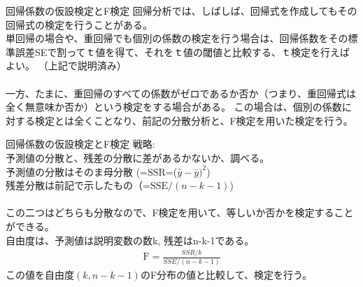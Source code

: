 \documentclass[dvipdfmx,autodetect-engine, unicode, 10pt, aspectratio=169]{beamer}
\begin{document}
\begin{frame}{回帰係数の仮設検定とF検定}
    回帰分析では、しばしば、回帰式を作成してもその回帰式の検定を行うことがある。\\
    単回帰の場合や、重回帰でも個別の係数の検定を行う場合は、回帰係数をその標準誤差SEで割ってｔ値を得て、それをｔ値の閾値と比較する、ｔ検定を行えばよい。 （上記で説明済み）\\　\\
    一方、たまに、重回帰のすべての係数がゼロであるか否か（つまり、重回帰式は全く無意味か否か）という検定をする場合がある。
    この場合は、個別の係数に対する検定とは全くことなり、前記の分散分析と、F検定を用いた検定を行う。
\end{frame}

\begin{frame}{回帰係数の仮設検定とF検定}
    戦略: \\
    予測値の分散と、残差の分散に差があるかないか、調べる。\\
    予測値の分散はそのま母分散 (=SSR=($\hat{y} - \bar{y})^2$)\\
    残差分散は前記で示したもの（=$\text{SSE} / ( n -k - 1)$) \\
    \\
    この二つはどちらも分散なので、F検定を用いて、等しいか否かを検定することができる。\\
    自由度は、予測値は説明変数の数k, 残差はn-k-1である。\\
    \begin{align*}
        \text{F} = \frac{SSR/k}{SSE/(n-k-1)}
    \end{align*}
    この値を自由度$(k, n-k-1)$のF分布の値と比較して、検定を行う。
\end{frame}

\end{document}
